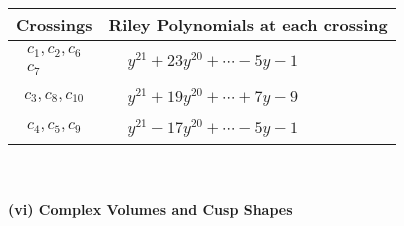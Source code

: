 \documentclass[1p]{elsarticle_modified}
\theoremstyle{definition}
\begin{document}
\begin{tabular}{m{50pt}|m{274pt}}
Crossings & \hspace{64pt}Riley Polynomials at each crossing \\
\hline $$\begin{aligned}c_{1},c_{2},c_{6}\\c_{7}\end{aligned}$$&$\begin{aligned}
&y^{21}+23 y^{20}+\cdots-5 y-1
\end{aligned}$\\
\hline $$\begin{aligned}c_{3},c_{8},c_{10}\end{aligned}$$&$\begin{aligned}
&y^{21}+19 y^{20}+\cdots+7 y-9
\end{aligned}$\\
\hline $$\begin{aligned}c_{4},c_{5},c_{9}\end{aligned}$$&$\begin{aligned}
&y^{21}-17 y^{20}+\cdots-5 y-1
\end{aligned}$\\
\hline
\end{tabular}\\~\\
\newpage\flushleft \textbf{(vi) Complex Volumes and Cusp Shapes}
\end{document}
